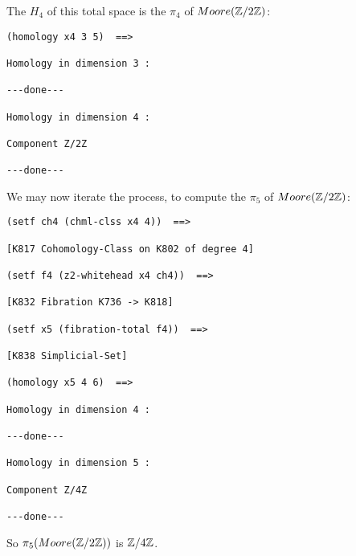 The $H_4$ of this total space is the $\pi_4$ of $Moore({\mathbb{Z}}/2{\mathbb{Z}})$:
{\footnotesize\begin{verbatim}
(homology x4 3 5)  ==>

Homology in dimension 3 :

---done---

Homology in dimension 4 :

Component Z/2Z

---done---
\end{verbatim}}
We may now iterate the process, to compute the $\pi_5$ of $Moore({\mathbb{Z}}/2{\mathbb{Z}})$:
{\footnotesize\begin{verbatim}
(setf ch4 (chml-clss x4 4))  ==>

[K817 Cohomology-Class on K802 of degree 4]

(setf f4 (z2-whitehead x4 ch4))  ==>

[K832 Fibration K736 -> K818]

(setf x5 (fibration-total f4))  ==>

[K838 Simplicial-Set]

(homology x5 4 6)  ==>

Homology in dimension 4 :

---done---

Homology in dimension 5 :

Component Z/4Z

---done---
\end{verbatim}}
So $\pi_5(Moore({\mathbb{Z}}/2{\mathbb{Z}}))$ is ${\mathbb{Z}}/4{\mathbb{Z}}$.

